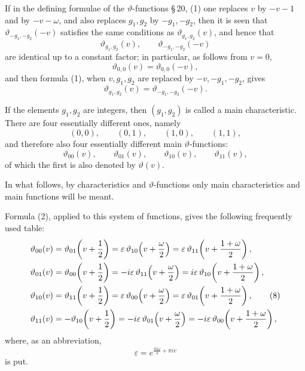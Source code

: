 \documentclass[11pt]{article}
\providecommand{\eps}{\varepsilon}
\begin{document}
If in the defining formulae of the $\vartheta$-functions \S\,20, (1) one replaces $v$ by $-v-1$ and by $-v-\omega$, and also replaces $g_1,g_2$ by $-g_1,-g_2$, then it is seen that $\vartheta_{-g_1,-g_2}(-v)$ satisfies the same conditions as $\vartheta_{g_1,g_2}(v)$, and hence that
\[
\vartheta_{g_1,g_2}(v),\qquad \vartheta_{-g_1,-g_2}(-v)
\]
are identical up to a constant factor; in particular, as follows from $v=0$,
\[
\vartheta_{0,0}(v)=\vartheta_{0,0}(-v),
\]
and then formula (1), when $v,g_1,g_2$ are replaced by $-v,-g_1,-g_2$, gives
\begin{equation}
\vartheta_{g_1,g_2}(v)=\vartheta_{-g_1,-g_2}(-v).
\tag{6}
\end{equation}

If the elements $g_1,g_2$ are integers, then $(g_1,g_2)$ is called a main characteristic. There are four essentially different ones, namely
\[
(0,0),\qquad (0,1),\qquad (1,0),\qquad (1,1),
\]
and therefore also four essentially different main $\vartheta$-functions:
\begin{equation}
\vartheta_{00}(v),\qquad \vartheta_{01}(v),\qquad \vartheta_{10}(v),\qquad \vartheta_{11}(v),
\tag{7}
\end{equation}
of which the first is also denoted by $\vartheta(v)$.

In what follows, by characteristics and $\vartheta$-functions only main characteristics and main functions will be meant.

Formula (2), applied to this system of functions, gives the following frequently used table:
\begin{align}
\vartheta_{00}(v)&=\vartheta_{01}\!\left(v+\frac12\right)=\eps\,\vartheta_{10}\!\left(v+\frac{\omega}{2}\right)=\eps\,\vartheta_{11}\!\left(v+\frac{1+\omega}{2}\right),\notag\\
\vartheta_{01}(v)&=\vartheta_{00}\!\left(v+\frac12\right)=-i\eps\,\vartheta_{11}\!\left(v+\frac{\omega}{2}\right)=i\eps\,\vartheta_{10}\!\left(v+\frac{1+\omega}{2}\right),\notag\\
\vartheta_{10}(v)&=\vartheta_{11}\!\left(v+\frac12\right)=\eps\,\vartheta_{00}\!\left(v+\frac{\omega}{2}\right)=\eps\,\vartheta_{01}\!\left(v+\frac{1+\omega}{2}\right),\tag{8}\\
\vartheta_{11}(v)&=-\vartheta_{10}\!\left(v+\frac12\right)=-i\eps\,\vartheta_{01}\!\left(v+\frac{\omega}{2}\right)=-i\eps\,\vartheta_{00}\!\left(v+\frac{1+\omega}{2}\right),
\notag
\end{align}
where, as an abbreviation,
\[
\eps=e^{\frac{\pi i\omega}{4}+\pi i v}
\]
is put.
\end{document}
